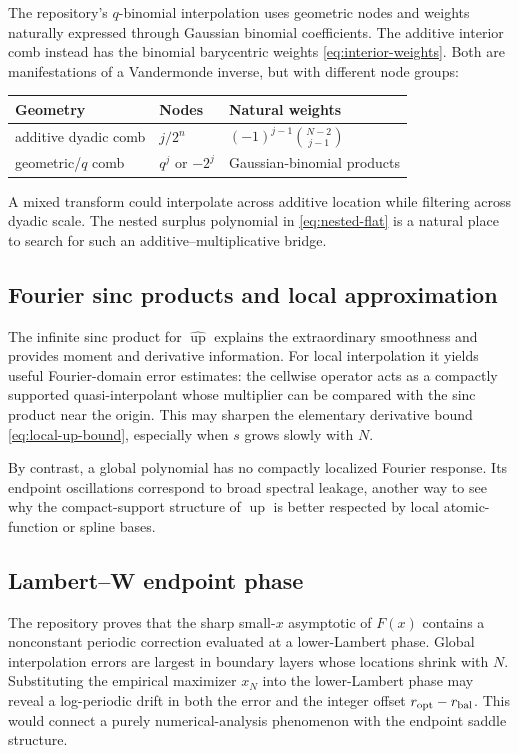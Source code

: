 \documentclass[11pt,oneside]{article}
\theoremstyle{definition}
\theoremstyle{remark}
\newcommand{\Up}{\operatorname{up}}
\begin{document}
The repository's $q$-binomial interpolation uses geometric nodes and weights naturally
expressed through Gaussian binomial coefficients.  The additive interior comb instead has
the binomial barycentric weights \eqref{eq:interior-weights}.  Both are manifestations of a
Vandermonde inverse, but with different node groups:
\begin{center}
\begin{tabular}{@{}lll@{}}
\toprule
Geometry & Nodes & Natural weights\\
\midrule
additive dyadic comb & $j/2^n$ & $(-1)^{j-1}\binom{N-2}{j-1}$\\
geometric/$q$ comb & $q^j$ or $-2^j$ & Gaussian-binomial products\\
\bottomrule
\end{tabular}
\end{center}
A mixed transform could interpolate across additive location while filtering across dyadic
scale.  The nested surplus polynomial in \eqref{eq:nested-flat} is a natural place to search
for such an additive--multiplicative bridge.

\subsection{Fourier sinc products and local approximation}

The infinite sinc product for $\widehat{\Up}$ explains the extraordinary smoothness and
provides moment and derivative information.  For local interpolation it yields useful
Fourier-domain error estimates: the cellwise operator acts as a compactly supported
quasi-interpolant whose multiplier can be compared with the sinc product near the origin.
This may sharpen the elementary derivative bound \eqref{eq:local-up-bound}, especially when
$s$ grows slowly with $N$.

By contrast, a global polynomial has no compactly localized Fourier response.  Its
endpoint oscillations correspond to broad spectral leakage, another way to see why the
compact-support structure of $\Up$ is better respected by local atomic-function or spline
bases.

\subsection{Lambert--W endpoint phase}

The repository proves that the sharp small-$x$ asymptotic of $F(x)$ contains a nonconstant
periodic correction evaluated at a lower-Lambert phase.  Global interpolation errors are
largest in boundary layers whose locations shrink with $N$.  Substituting the empirical
maximizer $x_N$ into the lower-Lambert phase may reveal a log-periodic drift in both the
error and the integer offset
$r_{\rm opt}-r_{\rm bal}$.  This would connect a purely numerical-analysis phenomenon with
the endpoint saddle structure.
\end{document}
